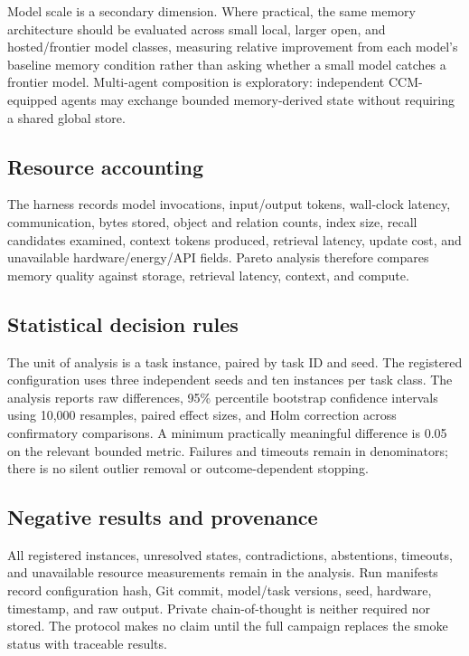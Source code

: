 Model scale is a secondary dimension. Where practical, the same memory architecture should be evaluated across small local, larger open, and hosted/frontier model classes, measuring relative improvement from each model's baseline memory condition rather than asking whether a small model catches a frontier model. Multi-agent composition is exploratory: independent CCM-equipped agents may exchange bounded memory-derived state without requiring a shared global store.

\subsection{Resource accounting}

The harness records model invocations, input/output tokens, wall-clock latency, communication, bytes stored, object and relation counts, index size, recall candidates examined, context tokens produced, retrieval latency, update cost, and unavailable hardware/energy/API fields. Pareto analysis therefore compares memory quality against storage, retrieval latency, context, and compute.

\subsection{Statistical decision rules}

The unit of analysis is a task instance, paired by task ID and seed. The registered configuration uses three independent seeds and ten instances per task class. The analysis reports raw differences, 95\% percentile bootstrap confidence intervals using 10,000 resamples, paired effect sizes, and Holm correction across confirmatory comparisons. A minimum practically meaningful difference is 0.05 on the relevant bounded metric. Failures and timeouts remain in denominators; there is no silent outlier removal or outcome-dependent stopping.

\subsection{Negative results and provenance}

All registered instances, unresolved states, contradictions, abstentions, timeouts, and unavailable resource measurements remain in the analysis. Run manifests record configuration hash, Git commit, model/task versions, seed, hardware, timestamp, and raw output. Private chain-of-thought is neither required nor stored. The protocol makes no claim until the full campaign replaces the smoke status with traceable results.
